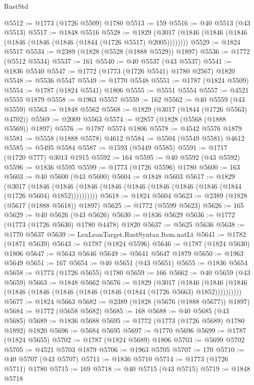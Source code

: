 \begin{lexlean}{RustStd}
\begin{coremodule}
@5512 := @1773 (@1726 @5509) @1780
@5513 := 159
@5516 := @40 @5513 (@43 @5513)
@5517 := @1848 @5516
@5528 := @1829 (@3017 (@1846 (@1846 (@1846 (@1846 (@1846 (@1846 (@1844 (@1726 @5517) @2005))))))))
@5529 := @1824 @5517
@5534 := @2389 (@1828 (@5528 (@1888 @5529)) @1897)
@5536 := @1772 (@5512 @5534)
@5537 := 161
@5540 := @40 @5537 (@43 @5537)
@5541 := @1836 @5540
@5547 := @1772 (@1773 (@1726 @5541) @1780 @2567) @1820
@5548 := @5536 @5547
@5549 := @1770 @5548
@5551 := @1787 (@1824 @5509)
@5554 := @1787 (@1824 @5541) @1806
@5555 := @5551 @5554
@5557 := @4521 @5555 @1879
@5558 := @1963 @5557
@5559 := 162
@5562 := @40 @5559 (@43 @5559)
@5563 := @1848 @5562
@5568 := @1829 (@3017 (@1844 (@1726 @5563) @4702))
@5569 := @2009 @5563
@5574 := @2857 (@1828 (@5568 (@1888 @5569)) @1897)
@5576 := @1787 @5574 @1806
@5578 := @4542 @5576 @1879
@5581 := @5558 (@1888 @5578) @4612
@5584 := @5504 (@5549 @5581) @4612
@5585 := @5495 @5584
@5587 := @1593 (@5449 @5585)
@5591 := @1717 (@1720 @777) @3013 @1915
@5592 := 164
@5595 := @40 @5592 (@43 @5592)
@5596 := @1836 @5595
@5599 := @1773 (@1726 @5596) @1780
@5600 := 163
@5603 := @40 @5600 (@43 @5600)
@5604 := @1848 @5603
@5617 := @1829
    (@3017
      (@1846 (@1846 (@1846 (@1846 (@1846 (@1846 (@1846 (@1846 (@1844 (@1726 @5604) @1852))))))))))
@5618 := @1824 @5604
@5623 := @2389 (@1828 (@5617 (@1888 @5618)) @1897)
@5625 := @1772 (@5599 @5623)
@5626 := 165
@5629 := @40 @5626 (@43 @5626)
@5630 := @1836 @5629
@5636 := @1772 (@1773 (@1726 @5630) @1780 @4478) @1820
@5637 := @5625 @5636
@5638 := @1770 @5637
@5639 := LexLeanTarget.RustSyntax.Item.natLt
@5641 := @1782 (@1871 @5639)
@5643 := @1787 (@1824 @5596)
@5646 := @1787 (@1824 @5630) @1806
@5647 := @5643 @5646
@5649 := @5641 @5647 @1879
@5650 := @1963 @5649
@5651 := 167
@5654 := @40 @5651 (@43 @5651)
@5655 := @1836 @5654
@5658 := @1773 (@1726 @5655) @1780
@5659 := 166
@5662 := @40 @5659 (@43 @5659)
@5663 := @1848 @5662
@5676 := @1829
    (@3017
      (@1846 (@1846 (@1846 (@1846 (@1846 (@1846 (@1846 (@1846 (@1844 (@1726 @5663) @1852))))))))))
@5677 := @1824 @5663
@5682 := @2389 (@1828 (@5676 (@1888 @5677)) @1897)
@5684 := @1772 (@5658 @5682)
@5685 := 168
@5688 := @40 @5685 (@43 @5685)
@5689 := @1836 @5688
@5695 := @1772 (@1773 (@1726 @5689) @1780 @1892) @1820
@5696 := @5684 @5695
@5697 := @1770 @5696
@5699 := @1787 (@1824 @5655)
@5702 := @1787 (@1824 @5689) @1806
@5703 := @5699 @5702
@5705 := @4521 @5703 @1879
@5706 := @1963 @5705
@5707 := 170
@5710 := @40 @5707 (@43 @5707)
@5711 := @1836 @5710
@5714 := @1773 (@1726 @5711) @1780
@5715 := 169
@5718 := @40 @5715 (@43 @5715)
@5719 := @1848 @5718

\end{coremodule}
\end{lexlean}

